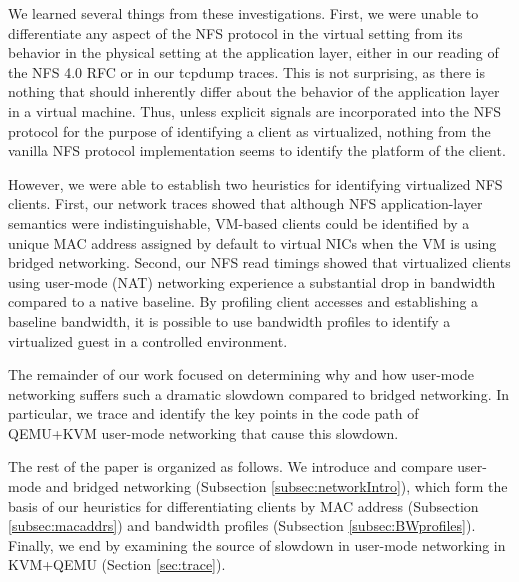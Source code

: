 \documentclass[11pt,pdftex,twocolumn]{article}
\begin{document}
We learned several things from these investigations. First, we were unable to differentiate any aspect of the NFS protocol in the virtual setting from its behavior in the physical setting at the application layer, either in our reading of the NFS 4.0 RFC or in our tcpdump traces. This is not surprising, as there is nothing that should inherently differ about the behavior of the application layer in a virtual machine. Thus, unless explicit signals are incorporated into the NFS protocol for the purpose of identifying a client as virtualized, nothing from the vanilla NFS protocol implementation seems to identify the platform of the client. 

However, we were able to establish two heuristics for identifying virtualized NFS clients. First, our network traces showed that although NFS application-layer semantics were indistinguishable, VM-based clients could be identified by a unique MAC address assigned by default to virtual NICs when the VM is using bridged networking. Second, our NFS read timings showed that virtualized clients using user-mode (NAT) networking experience a substantial drop in bandwidth compared to a native baseline. By profiling client accesses and establishing a baseline bandwidth, it is possible to use bandwidth profiles to identify a virtualized guest in a controlled environment.

The remainder of our work focused on determining why and how user-mode networking suffers such a dramatic slowdown compared to bridged networking. In particular, we trace and identify the key points in the code path of QEMU+KVM user-mode networking that cause this slowdown.

The rest of the paper is organized as follows. We introduce and compare user-mode and bridged networking (Subsection \ref{subsec:networkIntro}), which form the basis of our heuristics for differentiating clients by MAC address (Subsection \ref{subsec:macaddrs}) and bandwidth profiles (Subsection \ref{subsec:BWprofiles}). Finally, we end by examining the source of slowdown in user-mode networking in KVM+QEMU (Section \ref{sec:trace}).


%
\end{document}
